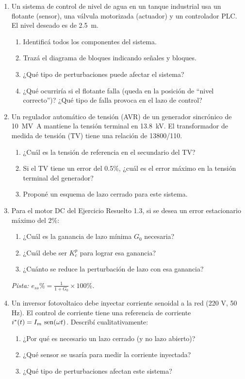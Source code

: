 \begin{enumerate}
  \item Un sistema de control de nivel de agua en un tanque industrial usa un
    flotante (sensor), una válvula motorizada (actuador) y un controlador PLC.
    El nivel deseado es de \SI{2.5}{\meter}.
    \begin{enumerate}
      \item Identificá todos los componentes del sistema.
      \item Trazá el diagrama de bloques indicando señales y bloques.
      \item ¿Qué tipo de perturbaciones puede afectar el sistema?
      \item ¿Qué ocurriría si el flotante falla (queda en la posición de ``nivel
        correcto'')? ¿Qué tipo de falla provoca en el lazo de control?
    \end{enumerate}

  \item Un regulador automático de tensión (AVR) de un generador sincrónico
    de \SI{10}{\mega\volt\ampere} mantiene la tensión terminal en
    \SI{13.8}{\kilo\volt}. El transformador de medida de tensión (TV) tiene
    una relación de \num{13800/110}.
    \begin{enumerate}
      \item ¿Cuál es la tensión de referencia en el secundario del TV?
      \item Si el TV tiene un error del 0.5\%, ¿cuál es el error máximo en
        la tensión terminal del generador?
      \item Proponé un esquema de lazo cerrado para este sistema.
    \end{enumerate}

  \item Para el motor DC del Ejercicio Resuelto 1.3, si se desea un error
    estacionario máximo del 2\%:
    \begin{enumerate}
      \item ¿Cuál es la ganancia de lazo mínima $G_0$ necesaria?
      \item ¿Cuál debe ser $K_c^p$ para lograr esa ganancia?
      \item ¿Cuánto se reduce la perturbación de lazo con esa ganancia?
    \end{enumerate}
    \textit{Pista: $e_{ss}\% = \frac{1}{1+G_0} \times 100\%$.}

  \item Un inversor fotovoltaico debe inyectar corriente senoidal a la red
    (220 V, 50 Hz). El control de corriente tiene una referencia de corriente
    $i^*(t) = I_m\,\operatorname{sen}(\omega t)$. Describí cualitativamente:
    \begin{enumerate}
      \item ¿Por qué es necesario un lazo cerrado (y no lazo abierto)?
      \item ¿Qué sensor se usaría para medir la corriente inyectada?
      \item ¿Qué tipo de perturbaciones afectan este sistema?
    \end{enumerate}


\end{enumerate}
